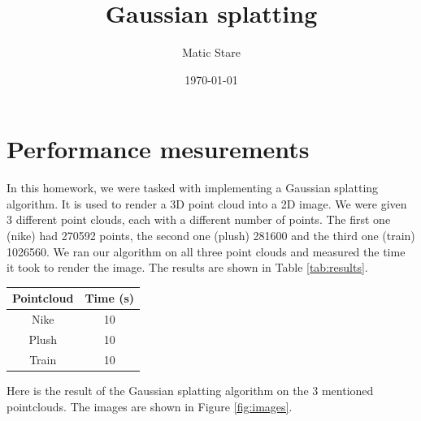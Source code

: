 \documentclass{article}
\title{Gaussian splatting}
\author{Matic Stare}
\date{\today}
\begin{document}
\maketitle

\tableofcontents
\newpage

\section{Performance mesurements}\label{sec:p1}
In this homework, we were tasked with implementing a Gaussian splatting algorithm. It is used to render a 3D point cloud into a 2D image. We were given 3 different point clouds, each with a different number of points. The first one (nike) had 270592 points, the second one (plush) 281600 and the third one (train) 1026560. We ran our algorithm on all three point clouds and measured the time it took to render the image. The results are shown in Table \ref{tab:results}.


\begin{center}
    \begin{tabular}{ |c|c| } 
     \hline
     Pointcloud & Time (s) \\
     \hline
     Nike & 10 \\ 
     Plush & 10 \\ 
     Train & 10 \\ 
     \hline
    \end{tabular}
\end{center}\label{tab:results}

Here is the result of the Gaussian splatting algorithm on the 3 mentioned pointclouds. The images are shown in Figure \ref{fig:images}.
\end{document}
